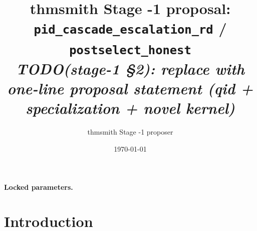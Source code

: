 \documentclass[11pt]{article}
\title{thmsmith Stage -1 proposal: \texttt{pid\_cascade\_escalation\_rd} / \texttt{postselect\_honest}%
  \\ \large\textit{TODO(stage-1 \S2): replace with one-line proposal statement (qid + specialization + novel kernel)}}
\author{thmsmith Stage -1 proposer}
\date{\today}
\theoremstyle{definition}
\theoremstyle{plain}
\theoremstyle{remark}
\begin{document}
\maketitle


\paragraph{Locked parameters.}

\begin{abstract}
\end{abstract}

\section{Introduction}
%
%
%
%
\end{document}
